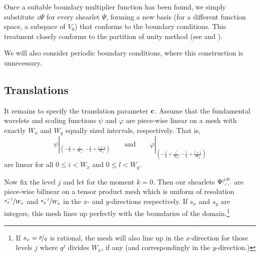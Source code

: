 Once a suitable boundary multiplier function has been found, we simply substitute $z\Psi$ for every shearlet
$\Psi$, forming a new basis (for a different function space, a subspace of $V_0$) that conforms to the
boundary conditions. This treatment closely conforms to the partition of unity method (see \cite{Melenk96} and
\cite{Babuska97}).

We will also consider periodic boundary conditions, where this construction is unnecessary.

\subsection{Translations} \label{sec:translations}

It remains to specify the translation parameter ${\bm c}$. Assume that the fundamental wavelets and scaling
functions $\psi$ and $\varphi$ are piece-wise linear on a mesh with exactly $W_x$ and $W_y$ equally sized
intervals, respectively. That is,
\[
    \psi|_{\left(-\frac{1}{2}+\frac{i}{W_x},-\frac{1}{2}+\frac{i+1}{W_x}\right)}
    \qquad \text{and} \qquad
    \varphi|_{\left(-\frac{1}{2}+\frac{l}{W_y},-\frac{1}{2}+\frac{l+1}{W_y}\right)}
\]
are linear for all $0 \leq i < W_x$ and $0 \leq l < W_y$.

Now fix the level $j$ and let for the moment $k=0$. Then our shearlets $\Psi_{\cdot,\cdot,\cdot}^{j,0}$ are
piece-wise bilinear on a tensor product mesh which is uniform of resolution $\nicefrac{s_x^{-j}}{W_x}$ and
$\nicefrac{s_y^{-j}}{W_y}$ in the $x$- and $y$-directions respectively. If $s_x$ and $s_y$ are integers, this
mesh lines up perfectly with the boundaries of the domain.\footnote{If $s_x=\nicefrac{p}{q}$ is rational, the
mesh will also line up in the $x$-direction for those levels $j$ where $q^j$ divides $W_x$, if any (and
correspondingly in the $y$-direction.)}

